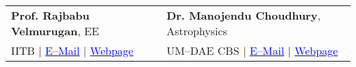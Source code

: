 \documentclass[margin,line]{res}
\begin{document}
\begin{resume}
\begin{tabular}{@{}p{3in}p{3in}}
\textbf{Prof. Rajbabu Velmurugan}, EE & \textbf{Dr. Manojendu Choudhury}, Astrophysics \\
IITB $|$ \href{mailto:rajbabu@ee.iitb.ac.in}{\textcolor{blue}{E--Mail}} $|$ \href{https://www.ee.iitb.ac.in/web/faculty/homepage/rajbabu}{\textcolor{blue}{Webpage}} & UM--DAE CBS $|$ \href{mailto:manojendu@cbs.ac.in}{\textcolor{blue}{E--Mail}} $|$ \href{http://www.cbs.ac.in/people/physics-faculty/manojendu-choudhury}{\textcolor{blue}{Webpage}} \\
\end{tabular}
\vspace{-0.15in}

\end{resume}
\end{document}
